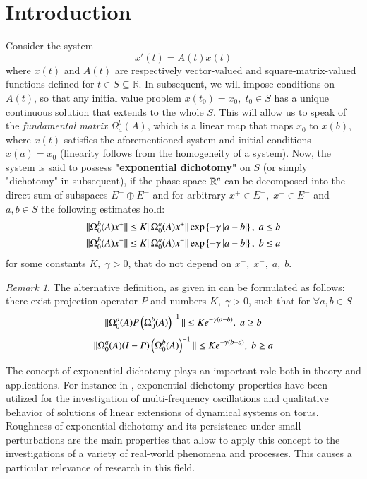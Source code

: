 \documentclass{elsarticle}
\theoremstyle{remark}
\newtheorem{remark}{Remark}
\begin{document}
\section{Introduction}
Consider the system 
\[x'(t)=A(t)x(t)\]
where $x(t)$ and $A(t)$ are respectively vector-valued and square-matrix-valued functions defined for $t\in S\subseteq\mathbb{R}$.
In subsequent, we will impose conditions on $A(t)$, so that any initial value problem $x(t_0)=x_0,\;t_0\in S$ has a unique
continuous solution
that extends to the whole $S$. This will allow us to speak of the \textit{fundamental matrix} $\Omega_a^b(A)$, which is a linear map
that maps $x_0$ to $x(b)$, where $x(t)$ satisfies the aforementioned system and initial conditions
$x(a)=x_0$ (linearity follows from the homogeneity of
a system).
Now, the system is
 said to possess \textbf{"exponential dichotomy"} on $S$ (or simply "dichotomy" in subsequent), if the phase space $\mathbb{R}^n$
can be decomposed into the direct sum of subspaces
$E^+\oplus E^-$ and for arbitrary $x^+\in E^+,\; x^-\in E^-$ and $a,b\in S$ the following estimates hold:
\begin{equation}\begin{aligned}\label{DichotomyDef}
	\|\Omega^b_0(A)x^+\|\leq K\|\Omega_0^a(A)x^+\|\exp\left\{-\gamma\left|a-b\right|\right\},\;a\leq b\\
	\|\Omega^b_0(A)x^-\|\leq K\|\Omega_0^a(A)x^-\|\exp\left\{-\gamma\left|a-b\right|\right\},\;b\leq a\\
\end{aligned}\end{equation}
for some constants $K,\;\gamma>0$, that do not depend on $x^+,\;x^-,\;a,\;b$.

\begin{remark}The alternative definition, as given in \cite{coppel1978dichotomies} can be formulated as follows: there exist projection-operator $P$ and numbers
$K,\;\gamma>0$, such that
 for $\forall a,b\in S$
\[\|\Omega_0^a(A)P\left(\Omega_0^b(A)\right)^{-1}\|\leq K e^{-\gamma(a-b)},\;a\geq b\]
\[\|\Omega_0^a(A)(I-P)\left(\Omega_0^b(A)\right)^{-1}\|\leq K e^{-\gamma(b-a)},\;b\geq a\]
\end{remark}

The concept of exponential dichotomy plays an important role both in theory and applications. For instance
 in \cite{mitropolsky2002dichotomies},
 exponential dichotomy properties have been utilized
 for the investigation of multi-frequency oscillations and qualitative behavior of solutions of linear extensions of dynamical
 systems on torus. Roughness of exponential dichotomy and its persistence under small perturbations are the main
 properties that allow to apply this concept to the investigations of
 a variety of real-world phenomena and processes. This causes a particular relevance of research in this field. 
\end{document}
